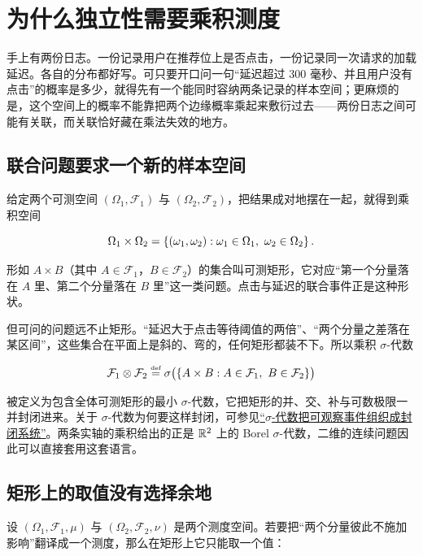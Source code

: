 \section{为什么独立性需要乘积测度}
\label{sec:12-Real-Analysis-Support/06-Product-Measures-and-Fubini/01}

手上有两份日志。一份记录用户在推荐位上是否点击，一份记录同一次请求的加载延迟。各自的分布都好写。可只要开口问一句``延迟超过 300 毫秒、并且用户没有点击''的概率是多少，就得先有一个能同时容纳两条记录的样本空间；更麻烦的是，这个空间上的概率不能靠把两个边缘概率乘起来敷衍过去——两份日志之间可能有关联，而关联恰好藏在乘法失效的地方。

\subsection{联合问题要求一个新的样本空间}

给定两个可测空间 \((\Omega_1,\mathcal F_1)\) 与 \((\Omega_2,\mathcal F_2)\)，把结果成对地摆在一起，就得到乘积空间

\[
\Omega_1\times\Omega_2=\set{(\omega_1,\omega_2):\omega_1\in\Omega_1,\ \omega_2\in\Omega_2}.
\]

形如 \(A\times B\)（其中 \(A\in\mathcal F_1\)，\(B\in\mathcal F_2\)）的集合叫可测矩形，它对应``第一个分量落在 \(A\) 里、第二个分量落在 \(B\) 里''这一类问题。点击与延迟的联合事件正是这种形状。

但可问的问题远不止矩形。``延迟大于点击等待阈值的两倍''、``两个分量之差落在某区间''，这些集合在平面上是斜的、弯的，任何矩形都装不下。所以乘积 \(\sigma\)-代数

\[
\mathcal F_1\otimes\mathcal F_2\stackrel{\text{\tiny def}}{=}\sigma\bigl(\left\{A\times B:A\in\mathcal F_1,\ B\in\mathcal F_2\right\}\bigr)
\]

被定义为包含全体可测矩形的最小 \(\sigma\)-代数，它把矩形的并、交、补与可数极限一并封闭进来。关于 \(\sigma\)-代数为何要这样封闭，可参见\hyperref[sec:12-Real-Analysis-Support/05-Measure-Integration-and-Conditional-Expectation/01]{``\(\sigma\)-代数把可观察事件组织成封闭系统''}。两条实轴的乘积给出的正是 \(\mathbb{R}^2\) 上的 Borel \(\sigma\)-代数，二维的连续问题因此可以直接套用这套语言。

\subsection{矩形上的取值没有选择余地}

设 \((\Omega_1,\mathcal F_1,\mu)\) 与 \((\Omega_2,\mathcal F_2,\nu)\) 是两个测度空间。若要把``两个分量彼此不施加影响''翻译成一个测度，那么在矩形上它只能取一个值：

